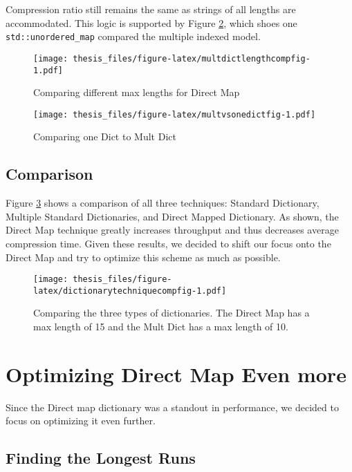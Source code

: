 \documentclass[12pt,twoside]{reedthesis}
\begin{document}
Compression ratio still remains the same as strings of all lengths are accommodated.
This logic is supported by Figure \ref{fig:multvsonedictfig}, which shoes one \texttt{std::unordered\_map} compared the multiple indexed model.
\begin{figure}
\centering
\texttt{[image: thesis\_files/figure-latex/multdictlengthcompfig-1.pdf]}
\caption{\label{fig:multdictlengthcompfig}Comparing different max lengths for Direct Map}
\end{figure}
\begin{figure}
\centering
\texttt{[image: thesis\_files/figure-latex/multvsonedictfig-1.pdf]}
\caption{\label{fig:multvsonedictfig}Comparing one Dict to Mult Dict}
\end{figure}
\hypertarget{comparison-1}{%
\subsection{Comparison}\label{comparison-1}}

Figure \ref{fig:dictionarytechniquecompfig} shows a comparison of all three techniques: Standard Dictionary, Multiple Standard Dictionaries, and Direct Mapped Dictionary. As shown, the Direct Map technique greatly increases throughput and thus decreases average compression time. Given these results, we decided to shift our focus onto the Direct Map and try to optimize this scheme as much as possible.
\begin{figure}
\centering
\texttt{[image: thesis\_files/figure-latex/dictionarytechniquecompfig-1.pdf]}
\caption{\label{fig:dictionarytechniquecompfig}Comparing the three types of dictionaries. The Direct Map has a max length of 15 and the Mult Dict has a max length of 10.}
\end{figure}
\hypertarget{optimizing-direct-map-even-more}{%
\section{Optimizing Direct Map Even more}\label{optimizing-direct-map-even-more}}

Since the Direct map dictionary was a standout in performance, we decided to focus on optimizing it even further.

\hypertarget{finding-the-longest-runs}{%
\subsection{Finding the Longest Runs}\label{finding-the-longest-runs}}
\end{document}
